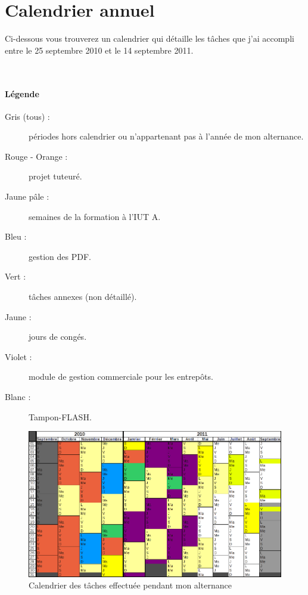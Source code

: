 \chapter{Calendrier annuel}
Ci-dessous vous trouverez un calendrier qui détaille les tâches que j'ai accompli entre le 25 septembre 2010 et le 14 septembre 2011.

~

\subsubsection{Légende}
\begin{description}
	\item[Gris (tous) :] périodes hors calendrier ou n'appartenant pas à l'année de mon alternance.
	\item[Rouge - Orange :] projet tuteuré.
	\item[Jaune pâle :] semaines de la formation à l'IUT A.
	\item[Bleu :] gestion des PDF.
	\item[Vert :] tâches annexes (non détaillé).
	\item[Jaune :] jours de congés.
	\item[Violet :] module de gestion commerciale pour les entrepôts.
	\item[Blanc : ] Tampon-FLASH.
\end{description}

\begin{figure}[h!]
	\begin{center}
		\includegraphics[scale=1, angle=90]{Contenu/Annexes/Images/Calendrier.png}
	\end{center}

	\caption{Calendrier des tâches effectuée pendant mon alternance}
	\label{calendrier}
\end{figure}

